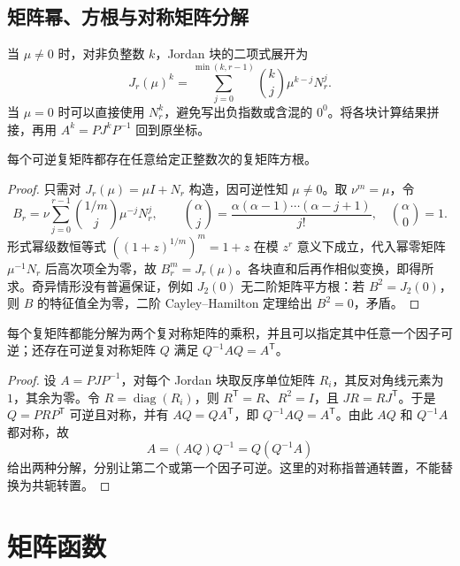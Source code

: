 \subsection{矩阵幂、方根与对称矩阵分解}

当 $\mu\ne0$ 时，对非负整数 $k$，Jordan 块的二项式展开为
\begin{equation}
 J_r(\mu)^k=
 \sum_{j=0}^{\min(k,r-1)}\binom{k}{j}\mu^{k-j}N_r^j.
 \label{eq:xie-ex-sim-matrix-power}
\end{equation}
当 $\mu=0$ 时可以直接使用 $N_r^k$，避免写出负指数或含混的 $0^0$。将各块计算结果拼接，再用 $A^k=PJ^kP^{-1}$ 回到原坐标。

\begin{proposition}
\label{prop:xie-ex-sim-complex-root}
每个可逆复矩阵都存在任意给定正整数次的复矩阵方根。
\end{proposition}
\begin{proof}
只需对 $J_r(\mu)=\mu I+N_r$ 构造，因可逆性知 $\mu\ne0$。取 $\nu^m=\mu$，令
\[
 B_r=\nu\sum_{j=0}^{r-1}\binom{1/m}{j}\mu^{-j}N_r^j,
 \qquad
 \binom{\alpha}{j}=\frac{\alpha(\alpha-1)\cdots(\alpha-j+1)}{j!},
 \quad \binom{\alpha}{0}=1.
\]
形式幂级数恒等式 $((1+z)^{1/m})^m=1+z$ 在模 $z^r$ 意义下成立，代入幂零矩阵 $\mu^{-1}N_r$ 后高次项全为零，故 $B_r^m=J_r(\mu)$。各块直和后再作相似变换，即得所求。奇异情形没有普遍保证，例如 $J_2(0)$ 无二阶矩阵平方根：若 $B^2=J_2(0)$，则 $B$ 的特征值全为零，二阶 Cayley--Hamilton 定理给出 $B^2=0$，矛盾。
\end{proof}

\begin{proposition}
每个复矩阵都能分解为两个复对称矩阵的乘积，并且可以指定其中任意一个因子可逆；还存在可逆复对称矩阵 $Q$ 满足 $Q^{-1}AQ=A^{\mathsf T}$。
\end{proposition}
\begin{proof}
设 $A=PJP^{-1}$，对每个 Jordan 块取反序单位矩阵 $R_i$，其反对角线元素为 $1$，其余为零。令 $R=\operatorname{diag}(R_i)$，则 $R^{\mathsf T}=R$、$R^2=I$，且 $JR=RJ^{\mathsf T}$。于是 $Q=PRP^{\mathsf T}$ 可逆且对称，并有 $AQ=QA^{\mathsf T}$，即 $Q^{-1}AQ=A^{\mathsf T}$。由此 $AQ$ 和 $Q^{-1}A$ 都对称，故
\[
 A=(AQ)Q^{-1}=Q(Q^{-1}A)
\]
给出两种分解，分别让第二个或第一个因子可逆。这里的对称指普通转置，不能替换为共轭转置。
\end{proof}

\section{矩阵函数}
\label{sec:xie-ex-sim-functions}

